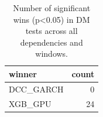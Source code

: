 \begin{table}[H]
\centering
\small
\caption{Number of significant wins (p<0.05) in DM tests across all dependencies and windows.}
\label{tab:dm_wins}
\begin{tabular}{lr}
\toprule
winner & count \\
\midrule
DCC\_GARCH & 0 \\
XGB\_GPU & 24 \\
\bottomrule
\end{tabular}

\end{table}
